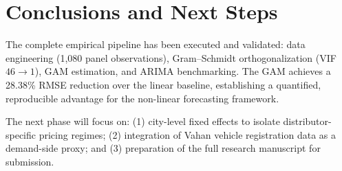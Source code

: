 \documentclass[11pt,a4paper]{article}
\begin{document}
\section{Conclusions and Next Steps}
The complete empirical pipeline has been executed and validated: data engineering (1,080 panel observations), Gram--Schmidt orthogonalization (VIF $46 \to 1$), GAM estimation, and ARIMA benchmarking. The GAM achieves a 28.38\% RMSE reduction over the linear baseline, establishing a quantified, reproducible advantage for the non-linear forecasting framework.

The next phase will focus on: (1) city-level fixed effects to isolate distributor-specific pricing regimes; (2) integration of Vahan vehicle registration data as a demand-side proxy; and (3) preparation of the full research manuscript for submission.
\end{document}
